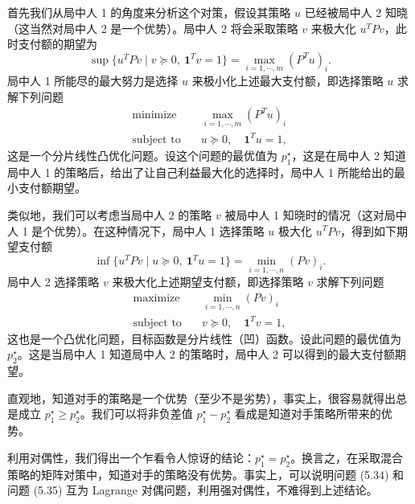 \documentclass[UTF8, 12pt, fontset=fandol, oneside]{ctexart}
\begin{document}
首先我们从局中人 1 的角度来分析这个对策，假设其策略 $u$ 已经被局中人 2 知晓（这当然对局中人 2 是一个优势）。局中人 2 将会采取策略 $v$ 来极大化 $u^TPv$，此时支付额的期望为
\[
\sup\{u^TPv\mid v\succeq 0,\ \mathbf{1}^Tv=1\}
=\max_{i=1,\cdots,m}(P^Tu)_i.
\]
局中人 1 所能尽的最大努力是选择 $u$ 来极小化上述最大支付额，即选择策略 $u$ 求解下列问题
\begin{equation}
\begin{aligned}
\text{minimize}\quad & \max_{i=1,\cdots,m}(P^Tu)_i\\
\text{subject to}\quad & u\succeq 0,\quad \mathbf{1}^Tu=1,
\end{aligned}
\tag{5.34}
\end{equation}
这是一个分片线性凸优化问题。设这个问题的最优值为 $p_1^\star$，这是在局中人 2 知道局中人 1 的策略后，给出了让自己利益最大化的选择时，局中人 1 所能给出的最小支付额期望。

类似地，我们可以考虑当局中人 2 的策略 $v$ 被局中人 1 知晓时的情况（这对局中人 1 是个优势）。在这种情况下，局中人 1 选择策略 $u$ 极大化 $u^TPv$，得到如下期望支付额
\[
\inf\{u^TPv\mid u\succeq 0,\ \mathbf{1}^Tu=1\}
=\min_{i=1,\cdots,n}(Pv)_i.
\]
局中人 2 选择策略 $v$ 来极大化上述期望支付额，即选择策略 $v$ 求解下列问题
\begin{equation}
\begin{aligned}
\text{maximize}\quad & \min_{i=1,\cdots,n}(Pv)_i\\
\text{subject to}\quad & v\succeq 0,\quad \mathbf{1}^Tv=1,
\end{aligned}
\tag{5.35}
\end{equation}
这也是一个凸优化问题，目标函数是分片线性（凹）函数。设此问题的最优值为 $p_2^\star$。这是当局中人 1 知道局中人 2 的策略时，局中人 2 可以得到的最大支付额期望。

直观地，知道对手的策略是一个优势（至少不是劣势），事实上，很容易就得出总是成立 $p_1^\star\geq p_2^\star$。我们可以将非负差值 $p_1^\star-p_2^\star$ 看成是知道对手策略所带来的优势。

利用对偶性，我们得出一个乍看令人惊讶的结论：$p_1^\star=p_2^\star$。换言之，在采取混合策略的矩阵对策中，知道对手的策略没有优势。事实上，可以说明问题 (5.34) 和问题 (5.35) 互为 Lagrange 对偶问题，利用强对偶性，不难得到上述结论。
\end{document}
